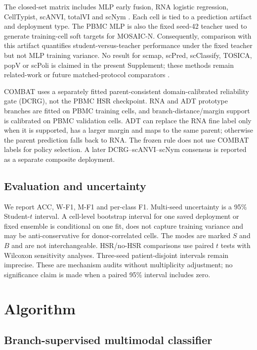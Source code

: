 \documentclass[unnumsec,webpdf,contemporary,large,numbered]{oup-authoring-template}
\begin{document}
The closed-set matrix includes MLP early fusion, RNA logistic regression, CellTypist, scANVI, totalVI and scNym \citep{dominguezconde2022,xu2021scvi,gayoso2021totalvi,kimmel2021scnym}. Each cell is tied to a prediction artifact and deployment type. The PBMC MLP is also the fixed seed-42 teacher used to generate training-cell soft targets for MOSAIC-N. Consequently, comparison with this artifact quantifies student-versus-teacher performance under the fixed teacher but not MLP training variance. No result for scmap, scPred, scClassify, TOSICA, popV or scPoli is claimed in the present Supplement; these methods remain related-work or future matched-protocol comparators \citep{kiselev2018scmap,alquicira2020scpred,lin2020scclassify,chen2023tosica}.

COMBAT uses a separately fitted parent-consistent domain-calibrated reliability gate (DCRG), not the PBMC HSR checkpoint. RNA and ADT prototype branches are fitted on PBMC training cells, and branch-distance/margin support is calibrated on PBMC validation cells. ADT can replace the RNA fine label only when it is supported, has a larger margin and maps to the same parent; otherwise the parent prediction falls back to RNA. The frozen rule does not use COMBAT labels for policy selection. A later DCRG--scANVI--scNym consensus is reported as a separate composite deployment.

\subsection{Evaluation and uncertainty}

We report ACC, W-F1, M-F1 and per-class F1. Multi-seed uncertainty is a 95\% Student-$t$ interval. A cell-level bootstrap interval for one saved deployment or fixed ensemble is conditional on one fit, does not capture training variance and may be anti-conservative for donor-correlated cells. The modes are marked $S$ and $B$ and are not interchangeable. HSR/no-HSR comparisons use paired $t$ tests with Wilcoxon sensitivity analyses. Three-seed patient-disjoint intervals remain imprecise. These are mechanism audits without multiplicity adjustment; no significance claim is made when a paired 95\% interval includes zero.

\section{Algorithm}

\subsection{Branch-supervised multimodal classifier}
\end{document}
